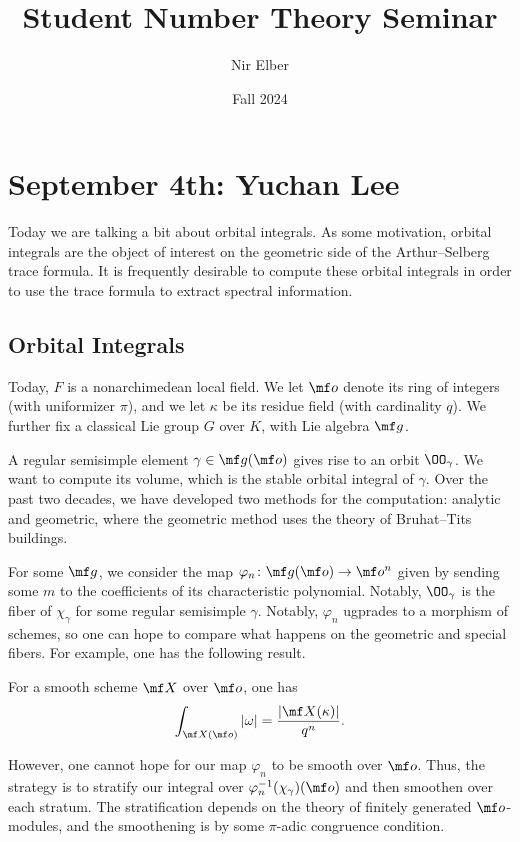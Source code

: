 \documentclass{article}
\title{Student Number Theory Seminar}
\author{Nir Elber}
\date{Fall 2024}
\begin{document}
\maketitle

\tableofcontents

\section{September 4th: Yuchan Lee}
Today we are talking a bit about orbital integrals. As some motivation, orbital integrals are the object of interest on the geometric side of the Arthur--Selberg trace formula. It is frequently desirable to compute these orbital integrals in order to use the trace formula to extract spectral information.

\subsection{Orbital Integrals}
Today, $F$ is a nonarchimedean local field. We let $\mf o$ denote its ring of integers (with uniformizer $\pi$), and we let $\kappa$ be its residue field (with cardinality $q$). We further fix a classical Lie group $G$ over $K$, with Lie algebra $\mf g$.

A regular semisimple element $\gamma\in\mf g(\mf o)$ gives rise to an orbit $\OO_\gamma$. We want to compute its volume, which is the stable orbital integral of $\gamma$. Over the past two decades, we have developed two methods for the computation: analytic and geometric, where the geometric method uses the theory of Bruhat--Tits buildings.

For some $\mf g$, we consider the map $\varphi_n\colon\mf g(\mf o)\to\mf o^n$ given by sending some $m$ to the coefficients of its characteristic polynomial. Notably, $\OO_\gamma$ is the fiber of $\chi_\gamma$ for some regular semisimple $\gamma$. Notably, $\varphi_n$ ugprades to a morphism of schemes, so one can hope to compare what happens on the geometric and special fibers. For example, one has the following result.
\begin{theorem}[Weil]
	For a smooth scheme $\mf X$ over $\mf o$, one has
	\[\int_{\mf X(\mf o)}\left|\omega\right|=\frac{\left|\mf X(\kappa)\right|}{q^n}.\]
\end{theorem}
However, one cannot hope for our map $\varphi_n$ to be smooth over $\mf o$. Thus, the strategy is to stratify our integral over $\varphi_n^{-1}(\chi_\gamma)(\mf o)$ and then smoothen over each stratum. The stratification depends on the theory of finitely generated $\mf o$-modules, and the smoothening is by some $\pi$-adic congruence condition.
\end{document}
